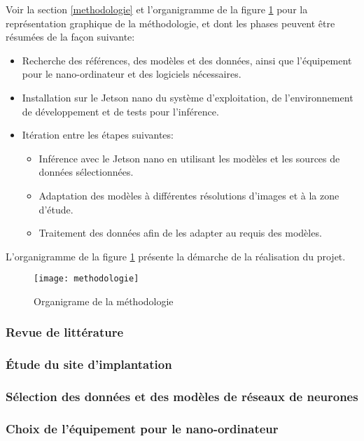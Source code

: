 \par Voir la section \ref{methodologie} et l'organigramme de la figure \ref{fig:methodologie1} pour la représentation graphique de la méthodologie, et dont les phases peuvent être résumées de la façon suivante:  
\begin{itemize}
   \item Recherche des références, des modèles et des données, ainsi que l'équipement pour le nano-ordinateur et des logiciels nécessaires.
   \item Installation sur le Jetson nano du système d'exploitation, de l'environnement de développement et de tests pour l'inférence.
   \item Itération entre les étapes suivantes:
   \begin{itemize}
      \item Inférence avec le Jetson nano en utilisant les modèles et les sources de données sélectionnées.
      \item Adaptation des modèles à différentes résolutions d'images et à la zone d'étude.
      \item Traitement des données afin de les adapter au requis des modèles.
   \end{itemize}
\end{itemize}

\label{methodologie}
L'organigramme de la figure \ref{fig:methodologie1} présente la démarche de la réalisation du projet. 
\begin{figure}
    \centering
    \texttt{[image: methodologie]}
    \caption{Organigrame de la méthodologie}
    \label{fig:methodologie1}
\end{figure}


\subsubsection{Revue de littérature}

\subsubsection{Étude du site d'implantation}

\subsubsection{Sélection des données et des modèles de réseaux de neurones}

\subsubsection{Choix de l'équipement pour le nano-ordinateur}

